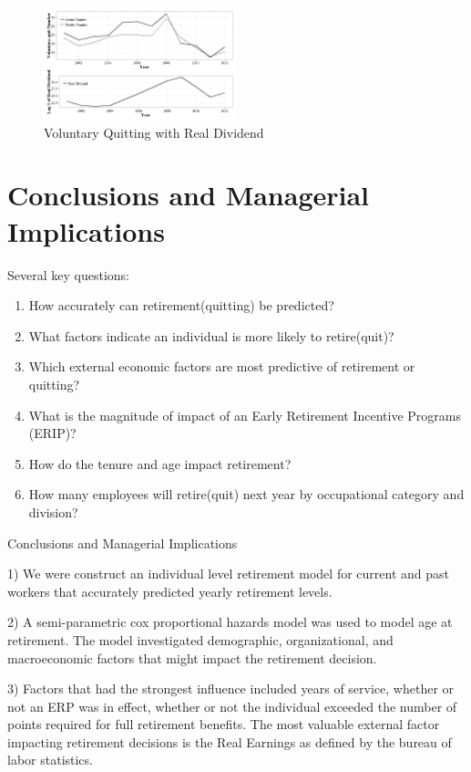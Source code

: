 \documentclass[12pt,letterpaper]{article}
\begin{document}
\begin{figure}
	\centering
	\includegraphics[width=0.5\textwidth]{realdividend.png}
	\caption{Voluntary Quitting with Real Dividend}
	\label{fig:vqrealdividend}
\end{figure}


\section{Conclusions and Managerial Implications}

Several key questions:
\begin{enumerate}
	\item How accurately can retirement(quitting) be predicted?
	\item What factors indicate an individual is more likely to retire(quit)?
	\item Which external economic factors are most predictive of retirement or quitting?
	\item What is the magnitude  of impact of an Early Retirement Incentive Programs (ERIP)?
	\item How do the tenure and age impact retirement?
	\item How many employees will retire(quit) next year by occupational category and division?
\end{enumerate}


Conclusions and Managerial Implications

1) We were construct an individual level retirement model for current and past workers that accurately predicted yearly retirement levels.

2) A semi-parametric cox proportional hazards model was used to model age at retirement.  The model investigated demographic, organizational, and macroeconomic factors that might impact the retirement decision.

3) Factors that had the strongest influence included years of service, whether or not an ERP was in effect, whether or not the individual exceeded the number of points required for full retirement benefits.  The most valuable external factor impacting retirement decisions is the Real Earnings as defined by the bureau of labor statistics.
\end{document}
